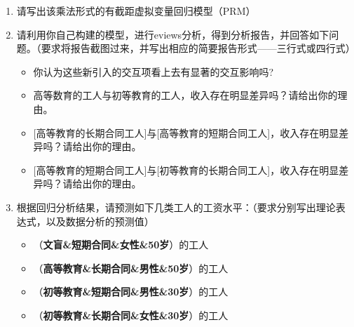 \documentclass[12pt,(landscape,a4paper),(portrait,a4paper)]{article}
\providecommand{\tightlist}{%
  \setlength{\itemsep}{0pt}\setlength{\parskip}{0pt}}
\theoremstyle{definition}
\theoremstyle{definition}
\theoremstyle{definition}
\theoremstyle{remark}
\begin{document}
\begin{enumerate}
  \begin{enumerate}
  \def\labelenumii{\alph{enumii}.}
  \tightlist
  \item
    请写出该乘法形式的有截距虚拟变量回归模型（PRM）
  \item
    请利用你自己构建的模型，进行eviews分析，得到分析报告，并回答如下问题。（要求将报告截图过来，并写出相应的简要报告形式------三行式或四行式）

    \begin{itemize}
    \tightlist
    \item
      你认为这些新引入的交互项看上去有显著的交互影响吗?
    \item
      高等数育的工人与初等教育的工人，收入存在明显差异吗？请给出你的理由。
    \item
      {[}高等教育的长期合同工人{]}与{[}高等教育的短期合同工人{]}，收入存在明显差异吗？请给出你的理由。
    \item
      {[}高等教育的短期合同工人{]}与{[}初等教育的长期合同工人{]}，收入存在明显差异吗？请给出你的理由。
    \end{itemize}
  \item
    根据回归分析结果，请预测如下几类工人的工资水平：（要求分别写出理论表达式，以及数据分析的预测值）

    \begin{itemize}
    \tightlist
    \item
      （\textbf{文盲\&短期合同\&女性\&50岁}）的工人
    \item
      （\textbf{高等教育\&长期合同\&男性\&50岁}）的工人
    \item
      （\textbf{初等教育\&短期合同\&男性\&30岁}）的工人
    \item
      （\textbf{初等教育\&长期合同\&女性\&30岁}）的工人
    \end{itemize}
  \end{enumerate}
\end{enumerate}
\end{document}
